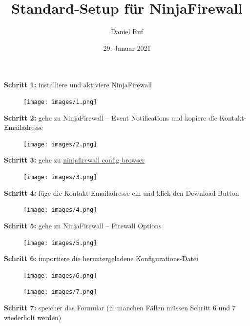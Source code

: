 \documentclass[a4paper]{article}
\title{Standard-Setup für NinjaFirewall}\let\Title\@title
\author{Daniel Ruf}\let\Author\@author
\date{29. Januar 2021} \let\Date\@date
\newcommand{\Version}{1.3}
\begin{document}
\lhead{\Title}
\lfoot{v\Version}
\rfoot{\today}

\noindent


\noindent
\textbf{Schritt 1:} installiere und aktiviere NinjaFirewall

\begin{figure}[H]
  \centering
  \texttt{[image: images/1.png]}
\end{figure}

\noindent
\textbf{Schritt 2:} gehe zu NinjaFirewall -- Event Notifications und kopiere die Kontakt-Emailadresse

\begin{figure}[H]
  \centering
  \texttt{[image: images/2.png]}
\end{figure}

\noindent
\textbf{Schritt 3:} gehe zu \href{https://danielruf.github.io/ninjafirewall-config-browser/}{ninjafirewall config browser}

\begin{figure}[H]
  \centering
  \texttt{[image: images/3.png]}
\end{figure}

\newpage

\noindent
\textbf{Schritt 4:} füge die Kontakt-Emailadresse ein und klick den Download-Button

\begin{figure}[H]
  \centering
  \texttt{[image: images/4.png]}
\end{figure}

\noindent
\textbf{Schritt 5:} gehe zu NinjaFirewall -- Firewall Options

\begin{figure}[H]
  \centering
  \texttt{[image: images/5.png]}
\end{figure}

\noindent
\textbf{Schritt 6:} importiere die heruntergeladene Konfigurations-Datei

\begin{figure}[H]
  \centering
  \texttt{[image: images/6.png]}
\end{figure}

\begin{figure}[H]
  \centering
  \texttt{[image: images/7.png]}
\end{figure}

\noindent
\textbf{Schritt 7:} speicher das Formular (in manchen Fällen müssen Schritt 6 und 7 wiederholt werden)
\end{document}
